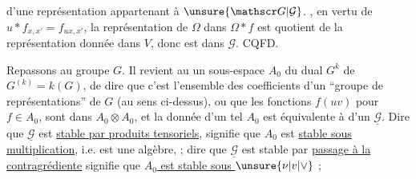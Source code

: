 d'une représentation  appartenant à $\unsure{\mathscr G|\mathcal G}$. ,
en vertu de $u*f_{x,x'}=f_{ux,x'}$, 
la représentation de $\Omega$ dans $\Omega*f$ est quotient
de la représentation donnée dans $V$, donc est
dans $\mathscr G$. CQFD.


Repassons au groupe $G$.  Il
revient au   un sous-espace $A_0$
du  dual $G^k$ de $G^{(k)}=k(G)$, de
dire que c'est l'ensemble des coefficients
d'un ``groupe de représentations''  de $G$
(au sens ci-dessus), ou que les
fonctions $f(uv)$  pour $f\in A_0$, sont dans
$A_0\otimes A_0$, et la donnée d'un tel $A_0$
est équivalente à  d'un $\underline{\mathscr G}$.
 Dire que $\underline{\mathscr G}$ est
\uline{stable par produits tensoriels}, signifie
que $A_0$ est \uline{stable sous multiplication},
i.e. est une algèbre,  ; dire que
$\underline{\mathscr G}$ est stable par \uline{passage à la contragrédiente}
signifie que \uline{$A_0$ est stable sous $\unsure{\nu|v|\vee}$} ;
